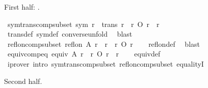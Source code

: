 \begin{isabellebody}
\begin{isamarkuptext}
  First half: .%
\end{isamarkuptext}\isamarkuptrue%
\isamarkupfalse%
\ sym{\isacharunderscore}{\kern0pt}trans{\isacharunderscore}{\kern0pt}comp{\isacharunderscore}{\kern0pt}subset{\isacharcolon}{\kern0pt}\ {\isachardoublequoteopen}sym\ r\ {\isasymLongrightarrow}\ trans\ r\ {\isasymLongrightarrow}\ r{\isasyminverse}\ O\ r\ {\isasymsubseteq}\ r{\isachardoublequoteclose}\isanewline
%
\isadelimproof
\ \ %
\endisadelimproof
%
\isatagproof
{}\isamarkupfalse%
\ trans{\isacharunderscore}{\kern0pt}def\ sym{\isacharunderscore}{\kern0pt}def\ converse{\isacharunderscore}{\kern0pt}unfold\ \isamarkupfalse%
\ blast%
\endisatagproof
{\isafoldproof}%
%
\isadelimproof
\isanewline
%
\endisadelimproof
\isanewline
{}\isamarkupfalse%
\ refl{\isacharunderscore}{\kern0pt}on{\isacharunderscore}{\kern0pt}comp{\isacharunderscore}{\kern0pt}subset{\isacharcolon}{\kern0pt}\ {\isachardoublequoteopen}refl{\isacharunderscore}{\kern0pt}on\ A\ r\ {\isasymLongrightarrow}\ r\ {\isasymsubseteq}\ r{\isasyminverse}\ O\ r{\isachardoublequoteclose}\isanewline
%
\isadelimproof
\ \ %
\endisadelimproof
%
\isatagproof
{}\isamarkupfalse%
\ refl{\isacharunderscore}{\kern0pt}on{\isacharunderscore}{\kern0pt}def\ \isamarkupfalse%
\ blast%
\endisatagproof
{\isafoldproof}%
%
\isadelimproof
\isanewline
%
\endisadelimproof
\isanewline
{}\isamarkupfalse%
\ equiv{\isacharunderscore}{\kern0pt}comp{\isacharunderscore}{\kern0pt}eq{\isacharcolon}{\kern0pt}\ {\isachardoublequoteopen}equiv\ A\ r\ {\isasymLongrightarrow}\ r{\isasyminverse}\ O\ r\ {\isacharequal}{\kern0pt}\ r{\isachardoublequoteclose}\isanewline
%
\isadelimproof
\ \ %
\endisadelimproof
%
\isatagproof
{}\isamarkupfalse%
\ equiv{\isacharunderscore}{\kern0pt}def\isanewline
\ \ \isamarkupfalse%
\ {\isacharparenleft}{\kern0pt}iprover\ intro{\isacharcolon}{\kern0pt}\ sym{\isacharunderscore}{\kern0pt}trans{\isacharunderscore}{\kern0pt}comp{\isacharunderscore}{\kern0pt}subset\ refl{\isacharunderscore}{\kern0pt}on{\isacharunderscore}{\kern0pt}comp{\isacharunderscore}{\kern0pt}subset\ equalityI{\isacharparenright}{\kern0pt}%
\endisatagproof
{\isafoldproof}%
%
\isadelimproof
%
\endisadelimproof
%
\begin{isamarkuptext}%
Second half.%
\end{isamarkuptext}\isamarkuptrue%
\isamarkupfalse%

\end{isabellebody}
